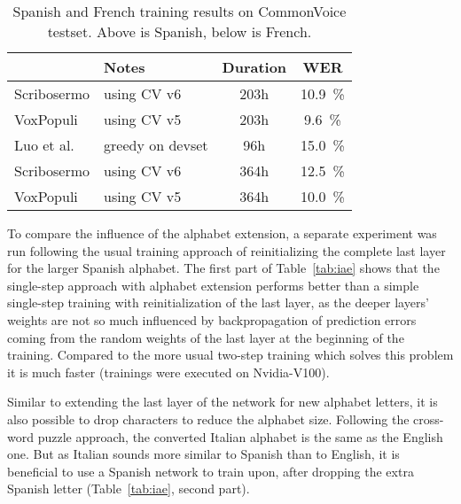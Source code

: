 \documentclass[a4paper]{article}
\begin{document}
\begin{table}[!htbp]
	\caption{Spanish and French training results on CommonVoice testset. Above is Spanish, below is French.}
	\label{tab:rqnef}
	\centering
	\begin{tabular}{llcc}
		\toprule
		\textbf{}  & \textbf{Notes}  & \textbf{Duration} & \textbf{WER} \\
		\midrule
		Scribosermo & using CV v6 & 203h  & \SI{10.9}{\percent} \\
		VoxPopuli \cite{VOXPOP} & using CV v5 & 203h & \SI{9.6}{\percent} \\
		Luo et al. \cite{QNTECR} & greedy on devset & 96h &
		\SI{15.0}{\percent} \\
		\midrule
		Scribosermo & using CV v6 & 364h & \SI{12.5}{\percent} \\
		VoxPopuli \cite{VOXPOP} & using CV v5 & 364h & \SI{10.0}{\percent} \\
		\bottomrule
	\end{tabular}
\end{table}

\vspace{9pt}
To compare the influence of the alphabet extension, a separate experiment was run following the usual training approach of reinitializing the complete last layer for the larger Spanish alphabet. The first part of Table~\ref{tab:iae} shows that the single-step approach with alphabet extension performs better than a simple single-step training with reinitialization of the last layer, as the deeper layers' weights are not so much influenced by backpropagation of prediction errors coming from the random weights of the last layer at the beginning of the training. Compared to the more usual two-step training which solves this problem it is much faster (trainings were executed on  Nvidia-V100). 

Similar to extending the last layer of the network for new alphabet letters, it is also possible to drop characters to reduce the alphabet size. Following the cross-word puzzle approach, the converted Italian alphabet is the same as the English one. But as Italian sounds more similar to Spanish than to English, it is beneficial to use a Spanish network to train upon, after dropping the extra Spanish letter (Table~\ref{tab:iae}, second part).
\end{document}
